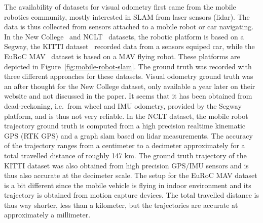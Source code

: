 The availability of datasets for visual odometry first came from the mobile robotics community,
mostly interested in SLAM from laser sensors (lidar).
The data is thus collected from sensors attached to a mobile robot or car navigating.
In the New College~\cite{smith2009new} and NCLT~\cite{carlevaris2016university} datasets,
the robotic platform is based on a Segway, the KITTI dataset~\cite{geiger2013vision}
recorded data from a sensors equiped car,
while the EuRoC MAV~\cite{burri2016euroc}
dataset is based on a MAV flying robot.
These platforms are depicted in Figure~\ref{fig:mobile-robot-slam}.
The ground truth was recorded with three different approaches for these datasets.
Visual odometry ground truth was an after thought for the New College dataset,
only available a year later on their website and not discussed in the paper.
It seems that it has been obtained from dead-reckoning, i.e.\ from wheel and IMU odometry,
provided by the Segway platform, and is thus not very reliable.
In the NCLT dataset, the mobile robot trajectory ground truth is computed from
a high precision realtime kinematic GPS (RTK GPS) and a graph slam based on lidar measurements.
The accuracy of the trajectory ranges from a centimeter to a decimeter approximately for a total
travelled distance of roughly 147 km.
The ground truth trajectory of the KITTI dataset was also obtained from high precision
GPS/IMU sensors and is thus also accurate at the decimeter scale.
The setup for the EuRoC MAV dataset is a bit different since the mobile vehicle
is flying in indoor environment and its trajectory is obtained from motion capture devices.
The total travelled distance is thus way shorter, less than a kilometer,
but the trajectories are accurate at approximately a millimeter.

